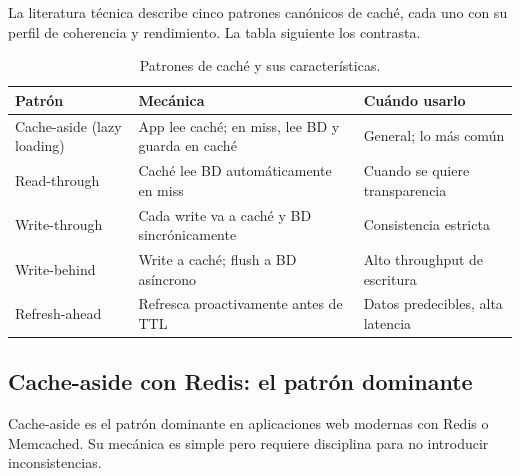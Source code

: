 La literatura técnica describe cinco patrones canónicos de
caché, cada uno con su perfil de coherencia y rendimiento. La tabla
siguiente los contrasta.


\begin{table}[htbp]
\centering
\caption{Patrones de caché y sus características.}
\footnotesize
\begin{tabularx}{\textwidth}{lXX}
\toprule
\textbf{Patrón} & \textbf{Mecánica} & \textbf{Cuándo usarlo}\\
\midrule
Cache-aside (lazy loading) & App lee caché; en miss, lee BD y guarda en caché & General; lo más común\\
Read-through & Caché lee BD automáticamente en miss & Cuando se quiere transparencia\\
Write-through & Cada write va a caché y BD sincrónicamente & Consistencia estricta\\
Write-behind & Write a caché; flush a BD asíncrono & Alto throughput de escritura\\
Refresh-ahead & Refresca proactivamente antes de TTL & Datos predecibles, alta latencia\\
\bottomrule
\end{tabularx}
\end{table}

\subsection{Cache-aside con Redis: el patrón dominante}

Cache-aside es el patrón dominante en aplicaciones web
modernas con Redis o Memcached. Su mecánica es simple pero requiere
disciplina para no introducir inconsistencias.


